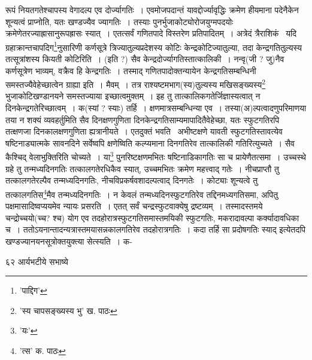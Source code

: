 \documentclass[11pt, openany]{book}
\begin{document}
{{{{\vspace{0.3cm}
\noindent रूपं नियतगतेश्चापस्य वेगादल्प एव दोर्ज्यागतिः~। एवमोजपदान्तं यावद्दोर्ज्यावृद्धिः क्रमेण हीयमाना पदेनैकेन शून्यत्वं प्राप्नोति, यतः खण्डज्यैव ज्यागतिः~। तस्याः पुनर्भुजाकोट्योरोजयुग्मपदयोः क्रमेणेतरज्याह्रासानुरूपह्रासः स्यात्~। एतत्सर्वं गणितपादे विस्तरेण प्रतिपादितम्~। अत्रेदं त्रैराशिकं \textendash\ यदि ग्रहाक्रान्तचापदिग\renewcommand{\thefootnote}{१}\footnote{'पाद्दिग'}नुसारिणी कर्णसूत्रे त्रिज्यातुल्यप्रदेशस्य कोटिः केन्द्रकोटिज्यातुल्या, तदा केन्द्रगतितुल्यस्य तत्सूत्रांशस्य कियती कोटिरिति~। (इति ?) सैव केन्द्रदोर्ज्यागतिस्तात्कालिकी~। नन्वृ(जी ? जु)नैव कर्णसूत्रेण भाव्यम्, वक्रैव हि केन्द्रगतिः~। तस्माद् गणितपादोक्तन्यायेन केन्द्रगतिसम्बन्धिनी समस्तज्यैवेहेच्छात्वेन ग्राह्या
इति~। मैवम्~। तत्र राश्यष्टमभाग(स्य)तुल्यस्य मखिसङ्ख्यस्य\renewcommand{\thefootnote}{२}\footnote{'स्य चापसङ्ख्यस्य भु' ख. पाठः} भुजाकोटिखण्डानयने समस्तज्याया इच्छात्वमुक्तम्~। इह तु तात्कालिकगतेर्जिज्ञास्यत्वात् न दिनकेन्द्रगतेरिच्छात्वम्~। क(स्यां ? स्याः) तर्हि~। क्षणमात्रसम्बन्धिन्या एव~। तस्या(अ)ल्पत्वादणुपरिमाणया तया न शक्यं व्यवहर्तुमिति सैव दिनक्षणगुणिता दिनकेन्द्रगतिसाम्यमापादितैवेहेच्छा, यतः स्फुटगतिरपि तत्क्षणजा दिनकालक्षणगुणिता ह्यत्रानीयते~। एतदुक्तं भवति  \textendash\ अभीष्टक्षणे यावती स्फुटगतिस्तावत्येव षष्टिनाड्यात्मके सावनदिने सर्वेष्वपि क्षणेष्विति कल्प्यमाना दिनगतिरेव तात्कालिकी  गतिरित्युच्यते~। सैव कैश्चिद् वेलाभुक्तिरिति चोच्यते~। या\renewcommand{\thefootnote}{३}\footnote{'यः'} पुनरिष्टक्षणमभितः षष्टिनाडिकागतिः सा च प्रायेणैतत्समा~। उच्चस्थे ग्रहे तु तन्मध्यदिनगतिः तत्कालगतेरधिकैव स्यात्, उच्चमभितः क्रमेण महत्त्वाद् गतेः~। नीचप्राप्तौ तु तत्कालगतेरल्पैव तन्मध्यदिनगतिः, नीचविप्रकर्षवशादल्पत्वाद् दिनगतेः~। कोट्याः शून्यत्वे तु तत्कालगतिस\renewcommand{\thefootnote}{४}\footnote{'त्स' क. पाठः}मैव तन्मध्यदिनगतिः~। न केवलं तन्मध्यदिनस्फुटगतिरेव तद्दिनमध्यगतिसमा, अपितु पक्षमासादिष्वप्ययमेव न्यायः प्रसरति~। एतत् सर्वं चन्द्रस्फुटवाक्येषु द्रष्टव्यम्~। तस्मादस्तमये चन्द्रोच्चयो(च्च? श्च) योग एव तदहोरात्रस्फुटगतिसमास्तमयिकी स्फुटगतिः, मकरादावल्पा कर्क्यादावधिका च~। ततोऽयनान्तादन्यत्रास्तमयासन्नकालगतिरेव तदहोरात्रगतिः~। कदा तर्हि सा प्रदोषगतिः स्याद् इत्येतदपि खण्डज्यानयनसूत्रोक्तयुक्त्या सेत्स्यति~। क-

\newpage

\vspace{3cm} ६२ \hspace{4cm}आर्यभटीये सभाष्ये

}}}}
\end{document}
